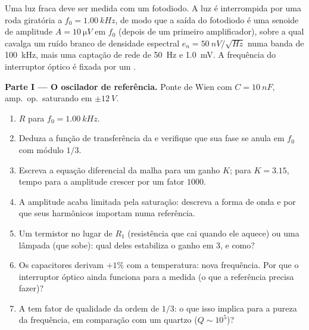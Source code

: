 \begin{problem}
\label{pb:b2:feedback-oscillators:1}

Uma luz fraca deve ser medida com um fotodiodo. A luz é interrompida
por uma roda giratória a $f_0 = \qty{1.00}{kHz}$, de modo que a saída do fotodiodo
é uma senoide de amplitude $A = \qty{10}{\micro V}$ em $f_0$ (depois de um
primeiro amplificador), sobre a qual cavalga um ruído branco de densidade espectral
$e_n = \qty{50}{nV/\sqrt{Hz}}$ numa banda de \qty{100}{kHz}, mais uma
captação de rede de \qty{50}{Hz} e \qty{1.0}{mV}. A frequência do interruptor óptico é
fixada por um .

\medskip
\noindent\textbf{Parte I --- O oscilador de referência.}
Ponte de Wien com $C = \qty{10}{nF}$, amp.\ op.\ saturando em $\pm\qty{12}{V}$.
\begin{enumerate}
  \item $R$ para $f_0 = \qty{1.00}{kHz}$.
  \item Deduza a função de transferência da  e verifique
        que sua fase se anula em $f_0$ com módulo $1/3$.
  \item Escreva a equação diferencial da malha para um ganho $K$; para
        $K = 3.15$, tempo para a amplitude crescer por um fator $1000$.
  \item A amplitude acaba limitada pela saturação: descreva a
        forma de onda e por que seus harmônicos importam numa referência.
  \item Um termistor no lugar de $R_1$ (resistência que cai quando ele
        aquece) ou uma lâmpada (que sobe): qual deles estabiliza o ganho em 3,
        e como?
  \item Os capacitores derivam $+1\%$ com a temperatura: nova frequência.
        Por que o interruptor óptico ainda funciona para a medida (o que
        a referência precisa fazer)?
  \item A  tem fator de qualidade da ordem de $1/3$: o que isso
        implica para a pureza da frequência, em comparação com um
        quartzo ($Q \sim 10^5$)?
\end{enumerate}


\end{problem}
